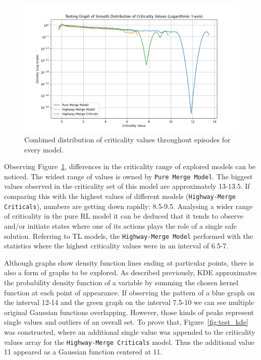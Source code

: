 \begin{figure}[H]
    \centering
    \includegraphics[width=\textwidth]{images/Criticality_distribution.png}
    \caption{Combined distribution of criticality values throughout episodes for every model.}
    \label{fig:crit_distribution}
\end{figure}

Observing Figure~\ref{fig:crit_distribution}, differences in the criticality range of explored models can be noticed. The widest range of values is owned by \texttt{Pure Merge Model}. The biggest values observed in the criticality set of this model are approximately 13-13.5. If comparing this with the highest values of different models (\texttt{Highway-Merge Criticals}), numbers are getting down rapidly: 8.5-9.5. Analysing a wider range of criticality in the pure RL model it can be deduced that it tends to observe and/or initiate states where one of its actions plays the role of a single safe solution. Referring to TL models, the \texttt{Highway-Merge Model} performed with the statistics where the highest criticality values were in an interval of 6.5-7.

Although graphs show density function lines ending at particular points, there is also a form of graphs to be explored. As described previously, KDE approximates the probability density function of a variable by summing the chosen kernel function at each point of appearance. If observing the pattern of a blue graph on the interval 12-14 and the green graph on the interval 7.5-10 we can see multiple original Gaussian functions overlapping. However, those kinds of peaks represent single values and outliers of an overall set. To prove that, Figure~\ref{fig:test_kde} was constructed, where an additional single value was appended to the criticality values array for the \texttt{Highway-Merge Criticals} model. Thus the additional value 11 appeared as a Gaussian function centered at 11.

